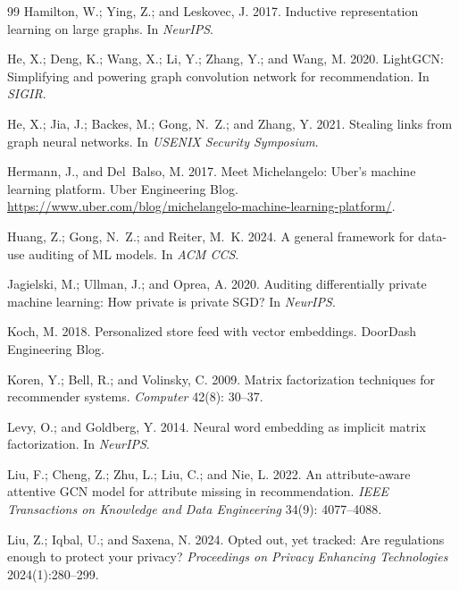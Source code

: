 \documentclass[10pt,twocolumn,letterpaper]{article}
\theoremstyle{definition}
\begin{document}
\begin{thebibliography}{99}
Hamilton, W.; Ying, Z.; and Leskovec, J. 2017.
\newblock Inductive representation learning on large graphs.
\newblock In \emph{NeurIPS}.

He, X.; Deng, K.; Wang, X.; Li, Y.; Zhang, Y.; and Wang, M. 2020.
\newblock LightGCN: Simplifying and powering graph convolution network for recommendation.
\newblock In \emph{SIGIR}.

He, X.; Jia, J.; Backes, M.; Gong, N.~Z.; and Zhang, Y. 2021.
\newblock Stealing links from graph neural networks.
\newblock In \emph{USENIX Security Symposium}.

Hermann, J., and Del~Balso, M. 2017.
\newblock Meet Michelangelo: Uber's machine learning platform.
\newblock Uber Engineering Blog. \url{https://www.uber.com/blog/michelangelo-machine-learning-platform/}.

Huang, Z.; Gong, N.~Z.; and Reiter, M.~K. 2024.
\newblock A general framework for data-use auditing of ML models.
\newblock In \emph{ACM CCS}.

Jagielski, M.; Ullman, J.; and Oprea, A. 2020.
\newblock Auditing differentially private machine learning: How private is private SGD?
\newblock In \emph{NeurIPS}.

Koch, M. 2018.
\newblock Personalized store feed with vector embeddings.
\newblock DoorDash Engineering Blog.

Koren, Y.; Bell, R.; and Volinsky, C. 2009.
\newblock Matrix factorization techniques for recommender systems.
\newblock \emph{Computer} 42(8): 30--37.

Levy, O.; and Goldberg, Y. 2014.
\newblock Neural word embedding as implicit matrix factorization.
\newblock In \emph{NeurIPS}.

Liu, F.; Cheng, Z.; Zhu, L.; Liu, C.; and Nie, L. 2022.
\newblock An attribute-aware attentive {GCN} model for attribute missing in recommendation.
\newblock \emph{IEEE Transactions on Knowledge and Data Engineering} 34(9): 4077--4088.

Liu, Z.; Iqbal, U.; and Saxena, N. 2024.
\newblock Opted out, yet tracked: Are regulations enough to protect your privacy?
\newblock \emph{Proceedings on Privacy Enhancing Technologies} 2024(1):280--299.


\end{thebibliography}
\end{document}
